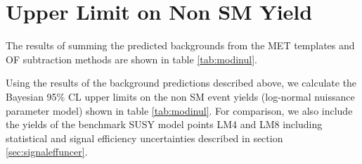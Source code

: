 \section{Upper Limit on Non SM Yield}
\label{sec:upperlimit}

The results of summing the predicted backgrounds from the MET templates and OF subtraction
methods are shown in table \ref{tab:modinul}.

\begin{comment}
\begin{table}[hbt]
  \begin{center}
	\caption{
	  \label{tab:systrestot}
	  Combination of predictions from MET templates and OF subtraction.
	}
	\begin{tabular}{lcccc}
	  \hline
	  \resulttitle
\hline

Prediction & 460.97 $\pm$ 7.69 $\pm$ 101.57  &    47.86 $\pm$ 2.66 $\pm$ 3.51  &    13.16 $\pm$ 1.50 $\pm$ 0.55  &     1.18 $\pm$ 0.46 $\pm$ 0.04  \\

\hline
	\end{tabular}
  \end{center}
\end{table}
\end{comment}


Using the results of the background predictions described above,
we calculate the Bayesian 95\% CL
upper limits on the non SM event yields 
(log-normal nuissance parameter model) 
shown in 
table \ref{tab:modinul}.
For comparison, we also include the yields of the benchmark SUSY model points LM4 and LM8
including statistical and signal efficiency uncertainties 
described in section \ref{sec:signaleffuncer}.

